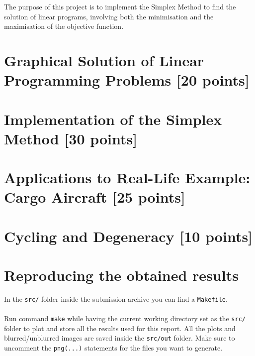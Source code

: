\documentclass[unicode,11pt,a4paper,oneside,numbers=endperiod,openany]{scrartcl}
\begin{document}
\setassignment
{}

\newline

\assignmentpolicy


The purpose of this project is to implement the Simplex Method to find the solution of linear programs, involving both the minimisation and the maximisation of the objective function.
\tableofcontents
\clearpage

\section{Graphical Solution of Linear Programming Problems [20 points]}


\section{Implementation of the Simplex Method [30 points]}


\section{Applications to Real-Life Example: Cargo Aircraft [25 points]}


\section{Cycling and Degeneracy [10 points]}

\section{Reproducing the obtained results}
In the \verb|src/| folder inside the submission archive you can find a \verb|Makefile|.\\\\
Run command \verb|make| while having the current working directory set as the \verb|src/| folder to plot and store all the results used for this report. All the plots and blurred/unblurred images are saved inside the \verb|src/out| folder. Make sure to uncomment the \verb|png(...)| statements for the files you want to generate.\\\\
\end{document}
